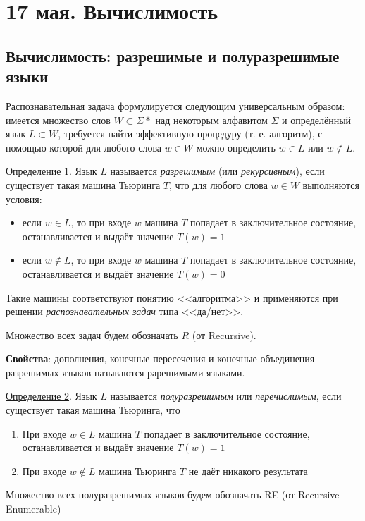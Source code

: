\chapter{17 мая. Вычислимость}
\section{Вычислимость: разрешимые и полуразрешимые языки}
Распознавательная задача формулируется следующим универсальным образом: имеется множество слов $W \subset \Sigma*$ над некоторым алфавитом $\Sigma$ и определённый язык $L \subset W$, требуется найти эффективную процедуру (т. е. алгоритм), с помощью которой для любого слова $w \in W$ можно определить $w \in L$ или $w \not\in L$.

\underline{Определение 1}. Язык $L$ называется \textit{разрешимым} (или \textit{рекурсивным}), если существует такая машина Тьюринга $T$, что для любого слова $w \in W$ выполняются условия:
\begin{itemize}
    \item если $w \in L$, то при входе $w$ машина $T$ попадает в заключительное состояние, останавливается и выдаёт значение $T(w) = 1$
    \item если $w \not \in L$, то при входе $w$ машина $T$ попадает в заключительное состояние, останавливается и выдаёт значение $T(w) = 0$
\end{itemize}

Такие машины соответствуют понятию <<алгоритма>> и применяются при решении \textit{распознавательных задач} типа <<да/нет>>.

Множество всех задач будем обозначать $R$ (от Recursive).

\textbf{Свойства}: дополнения, конечные пересечения и конечные объединения разрешимых языков называются рарешимыми языками.

\underline{Определение 2}. Язык $L$ называется \textit{полуразрешимым} или \textit{перечислимым}, если существует такая машина Тьюринга, что

\begin{enumerate}
    \item При входе $w \in L$ машина $T$ попадает в заключительное состояние, останавливается и выдаёт значение $T(w) = 1$
    \item При входе $w \not\in L$ машина Тьюринга $T$ не даёт никакого результата
\end{enumerate}

Множество всех полуразрешимых языков будем обозначать RE (от Recursive Enumerable)

